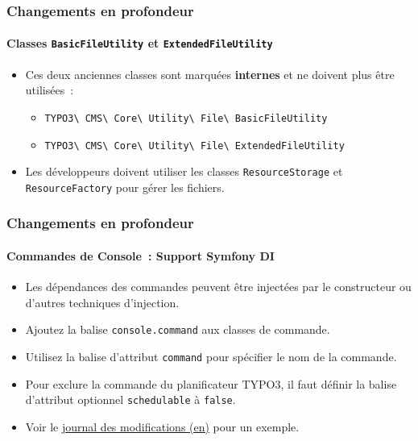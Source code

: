 \begin{frame}[fragile]
	\frametitle{Changements en profondeur}
	\framesubtitle{Classes \texttt{BasicFileUtility} et \texttt{ExtendedFileUtility}}

	\begin{itemize}
		\item Ces deux anciennes classes sont marquées \textbf{internes}
			et ne doivent plus être utilisées~:

			\begin{itemize}\small
				\item \texttt{TYPO3\textbackslash
					CMS\textbackslash
					Core\textbackslash
					Utility\textbackslash
					File\textbackslash
					BasicFileUtility}
				\item \texttt{TYPO3\textbackslash
					CMS\textbackslash
					Core\textbackslash
					Utility\textbackslash
					File\textbackslash
					ExtendedFileUtility}
			\end{itemize}

		\item Les développeurs doivent utiliser les classes \texttt{ResourceStorage}
			et \texttt{ResourceFactory} pour gérer les fichiers.

	\end{itemize}

\end{frame}


\begin{frame}[fragile]
	\frametitle{Changements en profondeur}
	\framesubtitle{Commandes de Console~: Support Symfony DI}

	\begin{itemize}
		\item Les dépendances des commandes peuvent être injectées par le constructeur ou d'autres
			techniques d'injection.
		\item Ajoutez la balise \texttt{console.command} aux classes de commande.
		\item Utilisez la balise d'attribut \texttt{command} pour spécifier le nom de la commande.
		\item Pour exclure la commande du planificateur TYPO3, il faut définir la balise d'attribut
			optionnel \texttt{schedulable} à \texttt{false}.

		\item Voir le
			\href{https://docs.typo3.org/c/typo3/cms-core/master/en-us/Changelog/10.3/Feature-89139-AddDependencyInjectionSupportForConsoleCommands.html}{journal des modifications (en)}
			pour un exemple.
	\end{itemize}

\end{frame}

